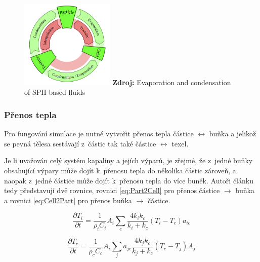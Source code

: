 \begin{figure}[hbt]
	\centering
	\captionsetup{justification=centering}
	\includegraphics[width=0.4\textwidth]{obrazky-figures/evapCycle.PNG}
	\textbf{Zdroj: } Evaporation and condensation of SPH-based fluids \cite{Evap&Cond}
	\label{fig:EvapCycle}
\end{figure}

\subsubsection{Přenos tepla}
Pro fungování simulace je nutné vytvořit přenos tepla částice $\leftrightarrow$ buňka a jelikož se pevná tělesa sestávají z~částic tak také částice $\leftrightarrow$ texel.

Je li uvažován celý systém kapaliny a jejích výparů, je zřejmé, že z~jedné buňky obsahující výpary může dojít k~přenosu tepla do několika částic zároveň, a naopak z~jedné částice může dojít k~přenosu tepla do více buněk. Autoři článku tedy představují dvě rovnice, rovnici \ref{eq:Part2Cell} pro přenos částice $\rightarrow$ buňka a rovnici \ref{eq:Cell2Part} pro přenos buňka $\rightarrow$ částice.

\begin{equation}
	\frac{\partial T_i}{\partial t} = \frac{1}{\rho_i C_i} A_i \sum_c \frac{4 k_i k_c}{k_i + k_c}(T_i - T_c)a_{ic}
	\label{eq:Part2Cell}
\end{equation}

\begin{equation}
	\frac{\partial T_c}{\partial t} = \frac{1}{\rho_c C_c} A_i \sum_j a_{jc}\frac{4 k_j k_c}{k_j + k_c}(T_c - T_j)A_j
	\label{eq:Cell2Part}
\end{equation}

